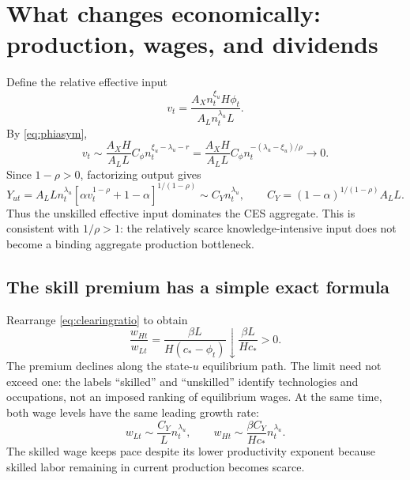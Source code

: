 \documentclass[11pt,a4paper]{article}
\newcommand{\asym}{\sim}
\begin{document}
\section{What changes economically: production, wages, and dividends}
Define the relative effective input
\begin{equation}
v_t=\frac{A_Xn_t^{\xi_u}H\phi_t}{A_Ln_t^{\lambda_u}L}.
\end{equation}
By \eqref{eq:phiasym},
\begin{equation}
v_t\asym\frac{A_XH}{A_LL}C_\phi
 n_t^{\xi_u-\lambda_u-r}
=\frac{A_XH}{A_LL}C_\phi n_t^{-(\lambda_u-\xi_u)/\rho}
\longrightarrow0.\label{eq:effectiveinput}
\end{equation}
Since $1-\rho>0$, factorizing output gives
\begin{equation}
Y_{ut}=A_LL n_t^{\lambda_u}
 \left[\alpha v_t^{1-\rho}+1-\alpha\right]^{1/(1-\rho)}
\asym C_Y n_t^{\lambda_u},\qquad
C_Y=(1-\alpha)^{1/(1-\rho)}A_LL.\label{eq:Yasym}
\end{equation}
Thus the unskilled effective input dominates the CES aggregate. This is
consistent with $1/\rho>1$: the relatively scarce knowledge-intensive input
does not become a binding aggregate production bottleneck.

\subsection{The skill premium has a simple exact formula}
Rearrange \eqref{eq:clearingratio} to obtain
\begin{equation}
\boxed{\frac{w_{Ht}}{w_{Lt}}
=\frac{\beta L}{H(c_*-\phi_t)}
\downarrow\frac{\beta L}{Hc_*}>0.}\label{eq:premium}
\end{equation}
The premium declines along the state-$u$ equilibrium path. The limit need not
exceed one: the labels ``skilled'' and ``unskilled'' identify technologies and
occupations, not an imposed ranking of equilibrium wages. At the same time,
both wage levels have the same leading growth rate:
\begin{equation}
w_{Lt}\asym\frac{C_Y}{L}n_t^{\lambda_u},\qquad
w_{Ht}\asym\frac{\beta C_Y}{Hc_*}n_t^{\lambda_u}.\label{eq:wageasym}
\end{equation}
The skilled wage keeps pace despite its lower productivity exponent because
skilled labor remaining in current production becomes scarce.
\end{document}
